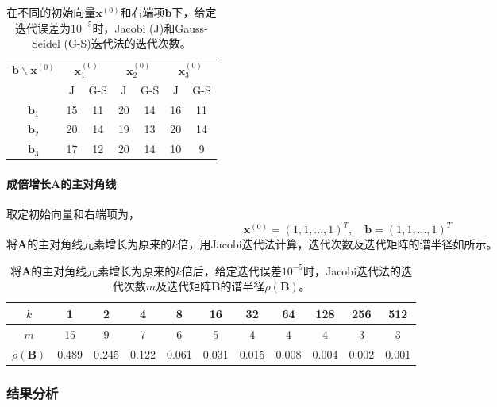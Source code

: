 \documentclass[12pt,a4paper]{article}
\begin{document}
\begin{table}
    \centering
    \caption{在不同的初始向量$\boldsymbol{x}^{(0)}$和右端项$\boldsymbol{b}$下，给定迭代误差为$10^{-5}$时，Jacobi (J)和Gauss-Seidel (G-S)迭代法的迭代次数。}
    \label{tab:ex3_iter}
    \begin{tabular}{c|cc|cc|cc}
        \toprule
        \multirow{2}{*}{\(\boldsymbol{b} \backslash \boldsymbol{x}^{(0)}\)} &
        \multicolumn{2}{c}{\(\boldsymbol{x}^{(0)}_1\)} & \multicolumn{2}{|c}{\(\boldsymbol{x}^{(0)}_2\)} &
        \multicolumn{2}{|c}{\(\boldsymbol{x}^{(0)}_3\)}\tabularnewline
        \cline{2-7}
        & J & G-S & J & G-S & J & G-S\tabularnewline
        \midrule
        \(\boldsymbol{b}_1\) & 15 & 11 & 20 & 14 & 16 & 11\tabularnewline
        \(\boldsymbol{b}_2\) & 20 & 14 & 19 & 13 & 20 & 14\tabularnewline
        \(\boldsymbol{b}_3\) & 17 & 12 & 20 & 14 & 10 & 9\tabularnewline
        \bottomrule
    \end{tabular}
\end{table}

\paragraph{成倍增长$\boldsymbol{A}$的主对角线} 取定初始向量和右端项为，
\begin{equation}
    \boldsymbol{x}^{(0)} = (1,1,...,1)^T, \quad \boldsymbol{b} = (1,1,...,1)^T
\end{equation}
将$\boldsymbol{A}$的主对角线元素增长为原来的$k$倍，用Jacobi迭代法计算，迭代次数及迭代矩阵的谱半径如所示。

\begin{table}
    \centering
    \caption{将$\boldsymbol{A}$的主对角线元素增长为原来的$k$倍后，给定迭代误差$10^{-5}$时，Jacobi迭代法的迭代次数$m$及迭代矩阵$\boldsymbol{B}$的谱半径$\rho(\boldsymbol{B})$。}
    \label{tab:ex3_a_diag}
    \begin{tabular}{c|cccccccccc}
        \toprule
        \(k\) & 1 & 2 & 4 & 8 & 16 & 32 & 64 & 128 & 256 & 512\tabularnewline
        \midrule
        \(m\) & 15 & 9 & 7 & 6 & 5 & 4 & 4 & 4 & 3 & 3\tabularnewline
        \(\rho(\boldsymbol{B})\) & 0.489 & 0.245 & 0.122 & 0.061 & 0.031 & 0.015
        & 0.008 & 0.004 & 0.002 & 0.001\tabularnewline
        \bottomrule
    \end{tabular}
\end{table}

\subsubsection{结果分析}
\end{document}
